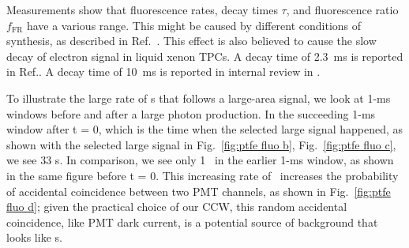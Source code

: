 Measurements show that fluorescence rates, decay times $\tau$, and fluorescence ratio $f_{\text{FR}}$ have a various range. This might be caused by different conditions of synthesis, as described in Ref.~\cite{Gachkovskii1969}. This effect is also believed to cause the slow decay of electron signal in liquid xenon TPCs. A decay time of \SI{2.3}{\ms} is reported in Ref.\cite{Sorensen2018}. A decay time of \SI{10}{\ms} is reported in internal review in \luxe .  

To illustrate the large rate of \sphe s that follows a large-area signal, we look at 1-\si{\ms} windows before and after a large photon production. In the succeeding 1-\si{\ms} window after t = \num{0}, which is the time when the selected large signal happened, as shown with the selected large signal in Fig.~\ref{fig:ptfe fluo b}, Fig.~\ref{fig:ptfe fluo c}, we see 33 \sphe s. In comparison, we see only 1 \sphe\ in the earlier 1-\si{\ms} window, as shown in the same figure before t = \num{0}. 
This increasing rate of \sphe\ increases the probability of accidental coincidence between two PMT channels, as shown in Fig.~\ref{fig:ptfe fluo d}; given the practical choice of our CCW, this random accidental coincidence, like PMT dark current, is a potential source of background that looks like \ees s.

